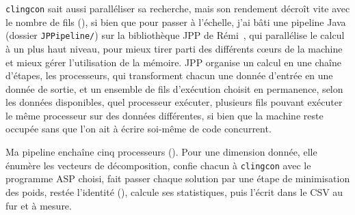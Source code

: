 \documentclass[12pt, a4paper]{article}
\begin{document}
\texttt{clingcon} sait aussi paralléliser sa recherche, mais son rendement décroît vite avec le nombre de fils (), si bien que pour passer à l'échelle, j'ai bâti une pipeline Java (dossier \texttt{JPPipeline/}) sur la bibliothèque JPP de Rémi~\cite{segretain2023}, qui parallélise le calcul à un plus haut niveau, pour mieux tirer parti des différents cœurs de la machine et mieux gérer l'utilisation de la mémoire.
JPP organise un calcul en une chaîne d'étapes, les processeurs, qui transforment chacun une donnée d'entrée en une donnée de sortie, et un ensemble de fils d'exécution choisit en permanence, selon les données disponibles, quel processeur exécuter, plusieurs fils pouvant exécuter le même processeur sur des données différentes, si bien que la machine reste occupée sans que l'on ait à écrire soi-même de code concurrent.

Ma pipeline enchaîne cinq processeurs ().
Pour une dimension donnée, elle énumère les vecteurs de décomposition, confie chacun à \texttt{clingcon} avec le programme ASP choisi, fait passer chaque solution par une étape de minimisation des poids, restée l'identité (), calcule ses statistiques, puis l'écrit dans le CSV au fur et à mesure.
\end{document}
